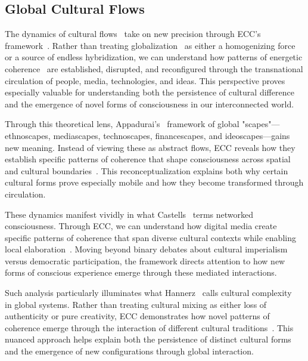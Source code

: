 \subsection*{Global Cultural Flows}


The dynamics of cultural flows~ take on new precision through ECC's~ framework~\cite{appadurai1996modernity, hannerz1996transnational}. Rather than treating globalization~ as either a homogenizing force or a source of endless hybridization, we can understand how patterns of energetic coherence~ are established, disrupted, and reconfigured through the transnational circulation of people, media, technologies, and ideas. This perspective proves especially valuable for understanding both the persistence of cultural difference and the emergence of novel forms of consciousness in our interconnected world.

Through this theoretical lens, Appadurai's~\cite{appadurai1996modernity} framework of global "scapes"---ethnoscapes, mediascapes, technoscapes, financescapes, and ideoscapes---gains new meaning. Instead of viewing these as abstract flows, ECC reveals how they establish specific patterns of coherence that shape consciousness across spatial and cultural boundaries~\cite{kearney1995local}. This reconceptualization explains both why certain cultural forms prove especially mobile and how they become transformed through circulation.

These dynamics manifest vividly in what Castells~\cite{castells2010rise} terms networked consciousness. Through ECC, we can understand how digital media create specific patterns of coherence that span diverse cultural contexts while enabling local elaboration~\cite{horst2012digital, pink2016digital}. Moving beyond binary debates about cultural imperialism versus democratic participation, the framework directs attention to how new forms of conscious experience emerge through these mediated interactions.

Such analysis particularly illuminates what Hannerz~\cite{hannerz1996transnational} calls cultural complexity~ in global systems. Rather than treating cultural mixing as either loss of authenticity or pure creativity, ECC demonstrates how novel patterns of coherence emerge through the interaction of different cultural traditions~\cite{kraidy2005hybridity}. This nuanced approach helps explain both the persistence of distinct cultural forms and the emergence of new configurations through global interaction.

